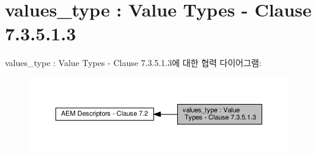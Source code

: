 \hypertarget{group__values__type}{}\section{values\+\_\+type \+: Value Types -\/ Clause 7.3.5.1.3}
\label{group__values__type}
values\+\_\+type \+: Value Types -\/ Clause 7.3.5.1.3에 대한 협력 다이어그램\+:
\nopagebreak
\begin{figure}[H]
\begin{center}
\leavevmode
\includegraphics[width=350pt]{group__values__type}
\end{center}
\end{figure}
